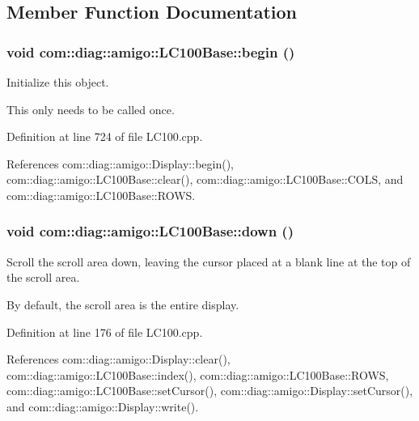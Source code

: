 \subsection{Member Function Documentation}
\hypertarget{classcom_1_1diag_1_1amigo_1_1LC100Base_a3cf988ae645ac743c6b5cafa2748e30b}{
\subsubsection[{begin}]{\setlength{\rightskip}{0pt plus 5cm}void com::diag::amigo::LC100Base::begin ()}}
\label{classcom_1_1diag_1_1amigo_1_1LC100Base_a3cf988ae645ac743c6b5cafa2748e30b}


Initialize this object. 

This only needs to be called once. 

Definition at line 724 of file LC100.cpp.



References com::diag::amigo::Display::begin(), com::diag::amigo::LC100Base::clear(), com::diag::amigo::LC100Base::COLS, and com::diag::amigo::LC100Base::ROWS.

\hypertarget{classcom_1_1diag_1_1amigo_1_1LC100Base_af532b82f424d25c8a7b014f16a463abb}{
\subsubsection[{down}]{\setlength{\rightskip}{0pt plus 5cm}void com::diag::amigo::LC100Base::down ()}}
\label{classcom_1_1diag_1_1amigo_1_1LC100Base_af532b82f424d25c8a7b014f16a463abb}


Scroll the scroll area down, leaving the cursor placed at a blank line at the top of the scroll area. 

By default, the scroll area is the entire display. 

Definition at line 176 of file LC100.cpp.



References com::diag::amigo::Display::clear(), com::diag::amigo::LC100Base::index(), com::diag::amigo::LC100Base::ROWS, com::diag::amigo::LC100Base::setCursor(), com::diag::amigo::Display::setCursor(), and com::diag::amigo::Display::write().



